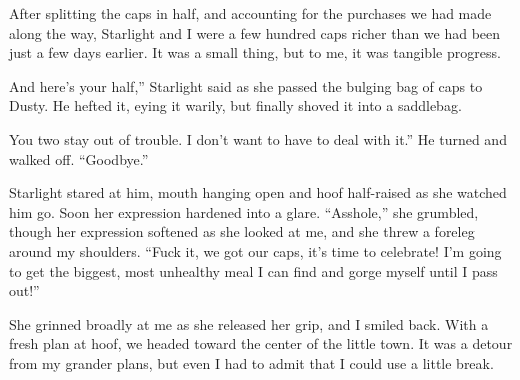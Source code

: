 After splitting the caps in half, and accounting for the purchases we had made along the way, Starlight and I were a few hundred caps richer than we had been just a few days earlier. It was a small thing, but to me, it was tangible progress.

\leavevmode{}And here’s your half,” Starlight said as she passed the bulging bag of caps to Dusty. He hefted it, eying it warily, but finally shoved it into a saddlebag.

\leavevmode{}You two stay out of trouble. I don’t want to have to deal with it.” He turned and walked off. “Goodbye.”

Starlight stared at him, mouth hanging open and hoof half-raised as she watched him go. Soon her expression hardened into a glare. “Asshole,” she grumbled, though her expression softened as she looked at me, and she threw a foreleg around my shoulders. “Fuck it, we got our caps, it’s time to celebrate! I’m going to get the biggest, most unhealthy meal I can find and gorge myself until I pass out!”

She grinned broadly at me as she released her grip, and I smiled back. With a fresh plan at hoof, we headed toward the center of the little town. It was a detour from my grander plans, but even I had to admit that I could use a little break.